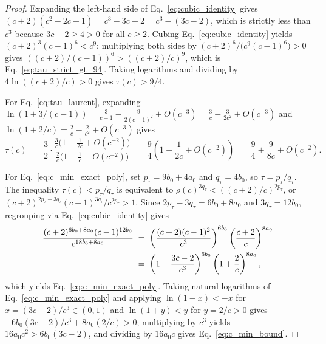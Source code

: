 \documentclass[11pt,a4paper]{article}
\theoremstyle{plain}
\theoremstyle{definition}
\theoremstyle{remark}
\begin{document}
\begin{proof}
Expanding the left-hand side of Eq.~\eqref{eq:cubic_identity} gives $(c + 2)(c^2 - 2c + 1) = c^3 - 3c + 2 = c^3 - (3c - 2)$, which is strictly less than $c^3$ because $3c - 2 \ge 4 > 0$ for all $c \ge 2$. Cubing Eq.~\eqref{eq:cubic_identity} yields $(c + 2)^3 (c - 1)^6 < c^9$; multiplying both sides by $(c + 2)^6 / \bigl(c^9 (c - 1)^6\bigr) > 0$ gives $((c + 2)/(c - 1))^6 > ((c + 2)/c)^9$, which is Eq.~\eqref{eq:tau_strict_gt_94}. Taking logarithms and dividing by $4\ln((c + 2)/c) > 0$ gives $\tau(c) > 9/4$.

For Eq.~\eqref{eq:tau_laurent}, expanding $\ln(1 + 3/(c - 1)) = \frac{3}{c - 1} - \frac{9}{2(c - 1)^2} + O(c^{-3}) = \frac{3}{c} - \frac{3}{2c^2} + O(c^{-3})$ and $\ln(1 + 2/c) = \frac{2}{c} - \frac{2}{c^2} + O(c^{-3})$ gives
\begin{equation}
    \tau(c) \;=\; \frac{3}{2}\cdot\frac{\frac{3}{c}\bigl(1 - \frac{1}{2c} + O(c^{-2})\bigr)}{\frac{2}{c}\bigl(1 - \frac{1}{c} + O(c^{-2})\bigr)} \;=\; \frac{9}{4}\left(1 + \frac{1}{2c} + O(c^{-2})\right) \;=\; \frac{9}{4} + \frac{9}{8c} + O(c^{-2}) .
    \label{eq:tau_laurent_step}
\end{equation}

For Eq.~\eqref{eq:c_min_exact_poly}, set $p_\tau = 9 b_0 + 4 a_0$ and $q_\tau = 4 b_0$, so $\tau = p_\tau / q_\tau$. The inequality $\tau(c) < p_\tau / q_\tau$ is equivalent to $\rho(c)^{3 q_\tau} < ((c + 2)/c)^{2 p_\tau}$, or $(c + 2)^{2 p_\tau - 3 q_\tau}(c - 1)^{3 q_\tau} / c^{2 p_\tau} > 1$. Since $2 p_\tau - 3 q_\tau = 6 b_0 + 8 a_0$ and $3 q_\tau = 12 b_0$, regrouping via Eq.~\eqref{eq:cubic_identity} gives
\begin{align}
    \frac{(c + 2)^{6 b_0 + 8 a_0}(c - 1)^{12 b_0}}{c^{18 b_0 + 8 a_0}}
    &\;=\; \left(\frac{(c + 2)(c - 1)^2}{c^3}\right)^{6 b_0}\left(\frac{c + 2}{c}\right)^{8 a_0} \notag\\
    &\;=\; \left(1 - \frac{3c - 2}{c^3}\right)^{6 b_0}\left(1 + \frac{2}{c}\right)^{8 a_0} ,
    \label{eq:c_factorization}
\end{align}
which yields Eq.~\eqref{eq:c_min_exact_poly}. Taking natural logarithms of Eq.~\eqref{eq:c_min_exact_poly} and applying $\ln(1 - x) < -x$ for $x = (3c - 2)/c^3 \in (0, 1)$ and $\ln(1 + y) < y$ for $y = 2/c > 0$ gives $-6 b_0 (3c - 2)/c^3 + 8 a_0 (2/c) > 0$; multiplying by $c^3$ yields $16 a_0 c^2 > 6 b_0 (3c - 2)$, and dividing by $16 a_0 c$ gives Eq.~\eqref{eq:c_min_bound}.
\end{proof}
\end{document}
